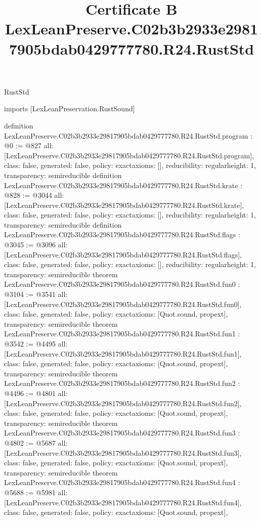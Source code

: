 \begin{lexlean}{RustStd}
\title{Certificate B LexLeanPreserve.C02b3b2933e29817905bdab0429777780.R24.RustStd}
\begin{coremodule}
imports [LexLeanPreservation.RustSound]

definition LexLeanPreserve.C02b3b2933e29817905bdab0429777780.R24.RustStd.program : @0 := @827 {
  all: [LexLeanPreserve.C02b3b2933e29817905bdab0429777780.R24.RustStd.program],
  class: false,
  generated: false,
  policy: exact{axioms: []},
  reducibility: regular{height: 1},
  transparency: semireducible
}
definition LexLeanPreserve.C02b3b2933e29817905bdab0429777780.R24.RustStd.krate : @828 := @3044 {
  all: [LexLeanPreserve.C02b3b2933e29817905bdab0429777780.R24.RustStd.krate],
  class: false,
  generated: false,
  policy: exact{axioms: []},
  reducibility: regular{height: 1},
  transparency: semireducible
}
definition LexLeanPreserve.C02b3b2933e29817905bdab0429777780.R24.RustStd.flags : @3045 := @3096 {
  all: [LexLeanPreserve.C02b3b2933e29817905bdab0429777780.R24.RustStd.flags],
  class: false,
  generated: false,
  policy: exact{axioms: []},
  reducibility: regular{height: 1},
  transparency: semireducible
}
theorem LexLeanPreserve.C02b3b2933e29817905bdab0429777780.R24.RustStd.fun0 : @3104 := @3541 {
  all: [LexLeanPreserve.C02b3b2933e29817905bdab0429777780.R24.RustStd.fun0],
  class: false,
  generated: false,
  policy: exact{axioms: [Quot.sound, propext]},
  transparency: semireducible
}
theorem LexLeanPreserve.C02b3b2933e29817905bdab0429777780.R24.RustStd.fun1 : @3542 := @4495 {
  all: [LexLeanPreserve.C02b3b2933e29817905bdab0429777780.R24.RustStd.fun1],
  class: false,
  generated: false,
  policy: exact{axioms: [Quot.sound, propext]},
  transparency: semireducible
}
theorem LexLeanPreserve.C02b3b2933e29817905bdab0429777780.R24.RustStd.fun2 : @4496 := @4801 {
  all: [LexLeanPreserve.C02b3b2933e29817905bdab0429777780.R24.RustStd.fun2],
  class: false,
  generated: false,
  policy: exact{axioms: [Quot.sound, propext]},
  transparency: semireducible
}
theorem LexLeanPreserve.C02b3b2933e29817905bdab0429777780.R24.RustStd.fun3 : @4802 := @5687 {
  all: [LexLeanPreserve.C02b3b2933e29817905bdab0429777780.R24.RustStd.fun3],
  class: false,
  generated: false,
  policy: exact{axioms: [Quot.sound, propext]},
  transparency: semireducible
}
theorem LexLeanPreserve.C02b3b2933e29817905bdab0429777780.R24.RustStd.fun4 : @5688 := @5981 {
  all: [LexLeanPreserve.C02b3b2933e29817905bdab0429777780.R24.RustStd.fun4],
  class: false,
  generated: false,
  policy: exact{axioms: [Quot.sound, propext]},
}
\end{coremodule}
\end{lexlean}
